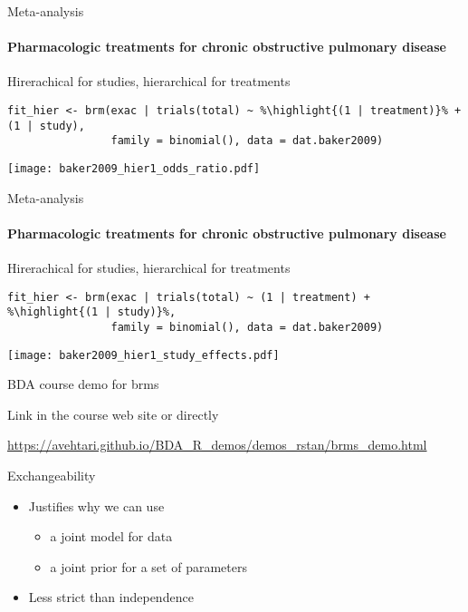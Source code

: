 \documentclass[finnish,english,t]{beamer}
\newcommand{\reducedstrut}{\vrule width 0pt height .9\ht\strutbox depth .9\dp\strutbox\relax}
\newcommand{\highlight}[1]{%
  \begingroup
  \setlength{\fboxsep}{0pt}%
  \colorbox{yellow!30}{\reducedstrut\detokenize{#1}\/}%
  \endgroup
}
\begin{document}
\begin{frame}[fragile]{Meta-analysis}
\framesubtitle{Pharmacologic treatments for chronic obstructive pulmonary disease}

\vspace{-0.75\baselineskip}
Hirerachical for studies, hierarchical for treatments

\vspace{-0.25\baselineskip}
\begin{verbatim}
fit_hier <- brm(exac | trials(total) ~ %\highlight{(1 | treatment)}% + (1 | study),
                family = binomial(), data = dat.baker2009)
\end{verbatim}
  {\texttt{[image: baker2009\_hier1\_odds\_ratio.pdf]}}

\end{frame}

\begin{frame}[fragile]{Meta-analysis}
\framesubtitle{Pharmacologic treatments for chronic obstructive pulmonary disease}

\vspace{-0.75\baselineskip}
Hirerachical for studies, hierarchical for treatments

\vspace{-0.25\baselineskip}
\begin{verbatim}
fit_hier <- brm(exac | trials(total) ~ (1 | treatment) + %\highlight{(1 | study)}%,
                family = binomial(), data = dat.baker2009)
\end{verbatim}

\begin{minipage}[t][][t]{1.2\linewidth}
  \hspace{-10mm}
  {\texttt{[image: baker2009\_hier1\_study\_effects.pdf]}}
\end{minipage}

\end{frame}

\begin{frame}[fragile]{BDA course demo for brms}

Link in the course web site or directly

\small
\url{https://avehtari.github.io/BDA_R_demos/demos_rstan/brms_demo.html}
  
\end{frame}

\begin{frame}{Exchangeability}

  \begin{itemize}
  \item Justifies why we can use
    \begin{itemize}
    \item a joint model for data
    \item a joint prior for a set of parameters
    \end{itemize}
  \item Less strict than independence
  \end{itemize}
\end{frame}
\end{document}
